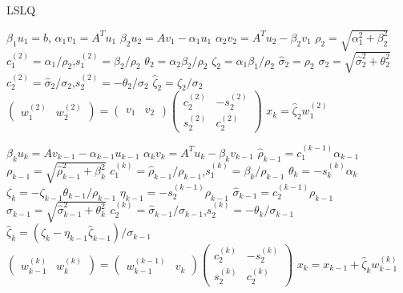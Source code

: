 \documentclass[11pt]{article}
\begin{document}
\begin{algorithm}
\caption{LSLQ}
\label{lslq1}
\begin{algorithmic}
	\State $\beta_1 u_1 = b$, $\alpha_1 v_1 = A^T u_1$
	\State $\beta_{2} u_{2} = A v_{1} - \alpha_{1} u_{1}$
	\State $\alpha_{2} v_{2} = A^T u_{2} - \beta_{2} v_{1}$
	\State $\rho_2 = \sqrt{\alpha^2_1 + \beta^2_2}$
	\State $c^{(2)}_1 = \alpha_1 / \rho_2$,\qquad $s^{(2)}_1 = \beta_2 / \rho_2$
	\State $\theta_2 = \alpha_2 \beta_2 / \rho_2$
	\State
	\State $\zeta_2 = \alpha_1 \beta_1 / \rho_2$
	\State
	\State $\hat{\sigma}_2 = \rho_2$
	\State $\sigma_2 = \sqrt{\hat{\sigma}^2_2 + \theta^2_2}$
	\State $c^{(2)}_2 = \hat{\sigma}_2 / \sigma_2$,\qquad $s^{(2)}_2 = -\theta_2 / \sigma_2$
	\State
	\State $\hat{\zeta}_2 = \zeta_2 / \sigma_2$
	\State
	\State $\begin{pmatrix} w^{(2)}_{1} & w^{(2)}_2 \end{pmatrix} = 
			\begin{pmatrix} v_1 & v_2 \end{pmatrix}
			\begin{pmatrix} c^{(2)}_2 & -s^{(2)}_2 \\ s^{(2)}_2 & c^{(2)}_2 \end{pmatrix}$
	\State $x_k = \hat{\zeta}_2 w^{(2)}_{1}$	
	
		\State $\beta_{k} u_{k} = A v_{k-1} - \alpha_{k-1} u_{k-1}$
		\State $\alpha_{k} v_{k} = A^T u_{k} - \beta_{k} v_{k-1}$
		\State
		\State $\hat{\rho}_{k-1} = c^{(k-1)}_1 \alpha_{k-1}$
		\State $\rho_{k-1} = \sqrt{\hat{\rho}^2_{k-1} + \beta^2_k}$
		\State $c^{(k)}_1 = \hat{\rho}_{k-1} / \rho_{k-1}$,\qquad $s^{(k)}_1 = \beta_k / \rho_{k-1}$
		\State $\theta_k = -s^{(k)}_k \alpha_k$
		\State
		\State $\zeta_k = -\zeta_{k-1} \theta_{k-1} / \rho_{k-1}$
		\State
		\State $\eta_{k-1} = -s^{(k-1)}_2 \rho_{k-1}$
		\State $\hat{\sigma}_{k-1} = c^{(k-1)}_2 \rho_{k-1}$
		\State $\sigma_{k-1} = \sqrt{\hat{\sigma}^2_{k-1} + \theta^2_k}$
		\State $c^{(k)}_2 = \hat{\sigma}_{k-1} / \sigma_{k-1}$,\qquad $s^{(k)}_2 = -\theta_k / \sigma_{k-1}$
		\State
		\State $\hat{\zeta}_k = (\zeta_k - \eta_{k-1} \hat{\zeta}_{k-1}) / \sigma_{k-1}$
		\State
		\State $\begin{pmatrix} w^{(k)}_{k-1} & w^{(k)}_k \end{pmatrix} = 
			\begin{pmatrix} w^{(k-1)}_{k-1} & v_k \end{pmatrix}
			\begin{pmatrix} c^{(k)}_2 & -s^{(k)}_2 \\ s^{(k)}_2 & c^{(k)}_2 \end{pmatrix}$
		\State $x_k = x_{k-1} + \hat{\zeta}_k w^{(k)}_{k-1}$
	\EndFor
\end{algorithmic}
\end{algorithm}
\end{document}
